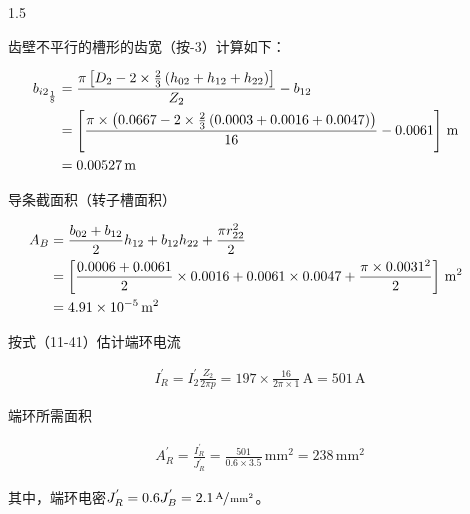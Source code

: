 \documentclass[a4paper,11pt]{ctexart}
\newcommand{\A}{\,\text{A}}
\newcommand{\m}{\,\text{m}}
\newcommand{\mm}{\,\text{mm}}
\newenvironment{shrinkeq}[2]
{
	\bgroup
	\addtolength\abovedisplayshortskip{#1}
	\addtolength\abovedisplayskip{#1}
	\addtolength\belowdisplayshortskip{#2}
	\addtolength\belowdisplayskip{#2}
}
{
	\egroup
	\ignorespacesafterend
}
\begin{document}
\begin{spacing}{1.5}
\par
齿壁不平行的槽形的齿宽（按-3）计算如下：
\begin{shrinkeq}{-1.5ex}{-1.5ex}
	\begin{align}
	b_{i2_{\frac{1}{8}}} &= \frac{\pi\left[D_2-2\times\frac{2}{3}\left(h_{02}+h_{12}+h_{22}\right)\right]}{Z_2}-b_{12} \\
	&=\left[\frac{\pi\times\left(0.0667 - 2\times\frac{2}{3}\left(0.0003+0.0016+0.0047\right)  \right)}{16}-0.0061 \right]\m\hspace{2em}\notag\\ 
	&= 0.00527\m \notag
	\end{align}
\end{shrinkeq}
导条截面积（转子槽面积）
\begin{shrinkeq}{-1.5ex}{-1.5ex}
	\begin{align}
	A_{B} &= \frac{b_{02}+b_{12}}{2}h_{12}+b_{12}h_{22}+\frac{\pi r_{22}^{2}}{2} \\
	&=\left[\frac{0.0006+0.0061}{2}\times 0.0016 +0.0061 \times 0.0047 +
	\frac{\pi\times 0.0031^2}{2}\right]\m^2 \hspace{2em}\notag\\
	&= 4.91\times 10^{-5}\m^2\notag
	\end{align}
\end{shrinkeq}
\par
按式（11-41）估计端环电流
\begin{shrinkeq}{-1.5ex}{-1.5ex}
	\begin{align}
	I_{R}^{'}=I_{2}^{'}\frac{Z_2}{2\pi p} = 197\times \frac{16}{2\pi\times 1}\A = 501\A
	\end{align}
\end{shrinkeq}
\par
端环所需面积
\begin{shrinkeq}{-1.5ex}{-1ex}
	\begin{align}
	A_{R}^{'} = \frac{I_{R}^{'}}{J_{R}^{'}} = \frac{501}{0.6\times 3.5}\mm^2 = 238\mm^2
	\end{align}
\end{shrinkeq}
其中，端环电密$J_{R}^{'} = 0.6 J_{B}^{'} =2.1 \sfrac{\A}{\mm^2}$。


\end{spacing}
\end{document}
